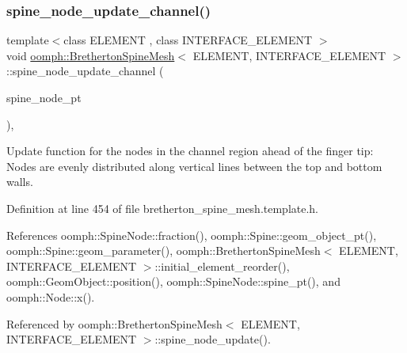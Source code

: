 \subsubsection{\texorpdfstring{spine\+\_\+node\+\_\+update\+\_\+channel()}{spine\_node\_update\_channel()}}
{\footnotesize\ttfamily template$<$class E\+L\+E\+M\+E\+NT , class I\+N\+T\+E\+R\+F\+A\+C\+E\+\_\+\+E\+L\+E\+M\+E\+NT $>$ \\
void \hyperlink{classoomph_1_1BrethertonSpineMesh}{oomph\+::\+Bretherton\+Spine\+Mesh}$<$ E\+L\+E\+M\+E\+NT, I\+N\+T\+E\+R\+F\+A\+C\+E\+\_\+\+E\+L\+E\+M\+E\+NT $>$\+::spine\+\_\+node\+\_\+update\+\_\+channel (\begin{DoxyParamCaption}\item[{\hyperlink{classoomph_1_1SpineNode}{Spine\+Node} $\ast$}]{spine\+\_\+node\+\_\+pt }\end{DoxyParamCaption})\hspace{0.3cm}{\ttfamily [inline]}, {\ttfamily [protected]}}



Update function for the nodes in the channel region ahead of the finger tip\+: Nodes are evenly distributed along vertical lines between the top and bottom walls. 



Definition at line 454 of file bretherton\+\_\+spine\+\_\+mesh.\+template.\+h.



References oomph\+::\+Spine\+Node\+::fraction(), oomph\+::\+Spine\+::geom\+\_\+object\+\_\+pt(), oomph\+::\+Spine\+::geom\+\_\+parameter(), oomph\+::\+Bretherton\+Spine\+Mesh$<$ E\+L\+E\+M\+E\+N\+T, I\+N\+T\+E\+R\+F\+A\+C\+E\+\_\+\+E\+L\+E\+M\+E\+N\+T $>$\+::initial\+\_\+element\+\_\+reorder(), oomph\+::\+Geom\+Object\+::position(), oomph\+::\+Spine\+Node\+::spine\+\_\+pt(), and oomph\+::\+Node\+::x().



Referenced by oomph\+::\+Bretherton\+Spine\+Mesh$<$ E\+L\+E\+M\+E\+N\+T, I\+N\+T\+E\+R\+F\+A\+C\+E\+\_\+\+E\+L\+E\+M\+E\+N\+T $>$\+::spine\+\_\+node\+\_\+update().

\mbox{\label{classoomph_1_1BrethertonSpineMesh_a0446cb0efaa31739f51ae0534a73d116}} 
